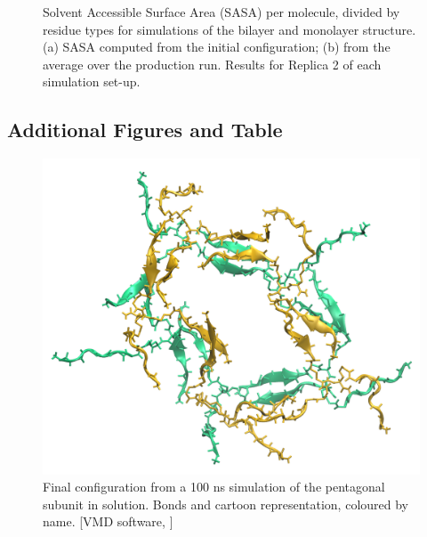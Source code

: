 \begin{figure}[t!]
\centering
{} 
\caption[(SI) Replica 2: SASA per residue of monolayer and bilater]{Solvent Accessible Surface Area (SASA) per molecule, divided by residue types for simulations of the bilayer and monolayer structure. (a) SASA computed from the initial configuration; (b) from the average over the production run. Results for Replica 2 of each simulation set-up.}
\label{fig:mono_bi_sasa2}
\end{figure}

\clearpage


\subsection{Additional Figures and Table}
\begin{figure}[h!]
\centering
\vspace{2.5cm}
\includegraphics[width=0.5\linewidth]{3results_capsule/pics/penta_final.png}
\caption[(SI) Pentagonal subunit atomistic simulation: final configuration]{Final configuration from a 100 ns simulation of the pentagonal subunit in solution. Bonds and cartoon representation, coloured by name. [VMD software, \citet{HUMP96}]}
\label{fig:penta_results_SI}
\end{figure}

